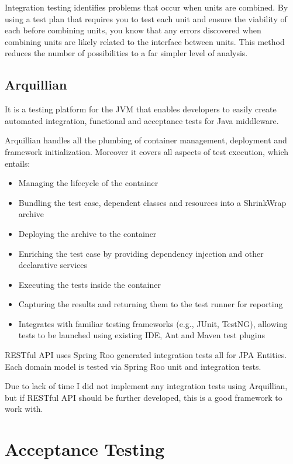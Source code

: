 	Integration testing identifies problems that occur when units are combined. By using a test plan that requires you to
	test each unit and ensure the viability of each before combining units, you know that any errors discovered when
	combining units are likely related to the interface between units. This method reduces the number of possibilities to a
	far simpler level of analysis.
	
	\subsection{Arquillian}
	
	It is a testing platform for the JVM that enables developers to easily create automated integration, functional and
	acceptance tests for Java middleware.
	
	Arquillian handles all the plumbing of container management, deployment and framework initialization. Moreover it
	covers all aspects of test execution, which entails:

	\begin{itemize}
		\item Managing the lifecycle of the container
		\item Bundling the test case, dependent classes and resources into a ShrinkWrap archive
		\item Deploying the archive to the container
		\item Enriching the test case by providing dependency injection and other declarative services
		\item Executing the tests inside the container
		\item Capturing the results and returning them to the test runner for reporting
		\item Integrates with familiar testing frameworks (e.g., JUnit, TestNG), allowing tests to be launched using existing
		IDE, Ant and Maven test plugins
	\end{itemize}
	
	RESTful API uses Spring Roo generated integration tests all for JPA Entities. Each domain model is tested via Spring
	Roo unit and integration tests.
	
	Due to lack of time I did not implement any integration tests using Arquillian, but if RESTful API should be further
	developed, this is a good framework to work with. 

	\section{Acceptance Testing}
	
